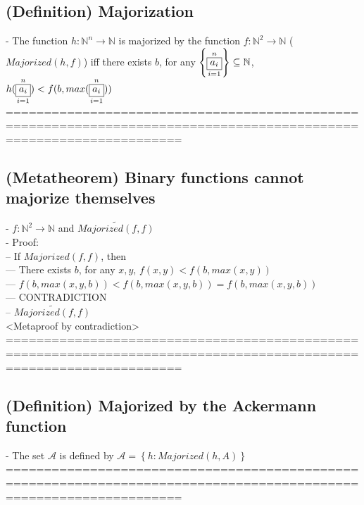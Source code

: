 \documentclass{book}
\newcommand{\pnot}[1]{\widetilde{#1}}
\newcommand{\set}[1]{\left\{ #1 \right\}}
\newcommand{\vdc}[3]{\underset{#2}{\overset{#3}{\fbox{$#1$}}}}
\begin{document}
\subsection{(Definition) Majorization} %
	- The function $h: \mathbb{N}^n \rightarrow \mathbb{N}$ is majorized by the function $f: \mathbb{N}^2 \rightarrow \mathbb{N}$ ($Majorized(h, f)$) iff there exists $b$, for any $\set{\vdc{a_i}{i=1}{n}} \subseteq \mathbb{N}$, $h(\vdc{a_i}{i=1}{n}) < f(b, max(\vdc{a_i}{i=1}{n}))$ \\
	===================================================================================================================
\subsection{(Metatheorem) Binary functions cannot majorize themselves} %
	- $f: \mathbb{N}^2 \rightarrow \mathbb{N}$ and $\pnot{Majorized(f, f)}$ \\
	- Proof: \\
		-- If $Majorized(f, f)$, then \\
			--- There exists $b$, for any $x, y$, $f(x, y) < f(b, max(x, y))$ \\
			--- $f(b, max(x, y, b)) < f(b, max(x, y, b)) = f(b, max(x, y, b))$ \\
			--- CONTRADICTION \\
		-- $\pnot{Majorized(f, f)}$ \\ <Metaproof by contradiction>
	===================================================================================================================
\subsection{(Definition) Majorized by the Ackermann function} %
	- The set $\mathcal{A}$ is defined by $\mathcal{A} = \set{h: Majorized(h, A)}$ \\
	===================================================================================================================
\end{document}
